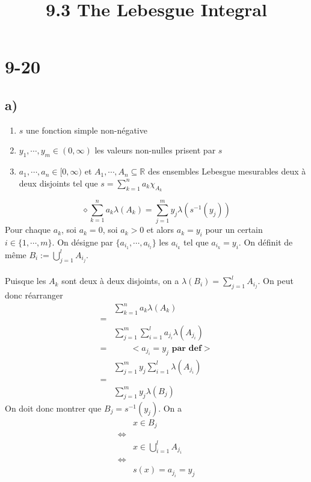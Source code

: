 \documentclass[a4paper,10pt]{article}
\title{9.3 The Lebesgue Integral}
\begin{document}
\maketitle

\section*{9-20}
\subsection*{a)}
\begin{enumerate}
 \item $s$ une fonction simple non-négative
 \item $y_1, \cdots, y_m \in (0, \infty)$ les valeurs non-nulles prisent par $s$
 \item $a_1, \cdots, a_n \in [0, \infty)$ et $A_1, \cdots , A_n \subseteq \mathbb{R}$ des ensembles Lebesgue mesurables deux à deux disjoints tel que $s = \sum_{k=1}^n a_k \chi_{A_k}$
\end{enumerate}

$$
   \diamond	\sum_{k=1}^n a_k \lambda ( A_k ) = \sum_{j=1}^m y_j \lambda(s^{-1} (y_j))	
$$
Pour chaque $a_k$, soi $a_k = 0$, soi $a_k > 0$ et alors $a_k = y_i$ pour un certain $i \in \{1 , \cdots, m \}$. On désigne par $\{a_{i_1}, \cdots, a_{i_l}\}$ les $a_{i_k}$ tel que $a_{i_k} = y_i$. On définit de même $B_i := \bigcup_{j=1}^l A_{i_j}$. 
\\
\\
Puisque les $A_k$ sont deux à deux disjoints, on a $\lambda (B_i) = \sum_{j=1}^l A_{i_j}$. On peut donc réarranger 
\begin{align*}
	& \sum_{k=1}^n a_k \lambda (A_k) \\
	= \\
	& \sum_{j=1}^m \sum_{i=1}^l a_{j_i} \lambda (A_{j_i}) \\
	= & \qquad < a_{j_i} = y_j \textbf{ par def} >\\
	& \sum_{j=1}^m y_j \sum_{i=1}^l \lambda	(A_{j_i}) \\
	= \\
	& \sum_{j=1}^m y_j \lambda (B_j)
\end{align*}
On doit donc montrer que $B_j = s^{-1} (y_j)$. On a
\begin{align*}
	& x \in B_j \\
	\Leftrightarrow \\
	& x \in \bigcup_{i = 1}^l A_{j_i} \\
	\Leftrightarrow \\
	& s(x) = a_{j_i} = y_j
\end{align*}
\end{document}
